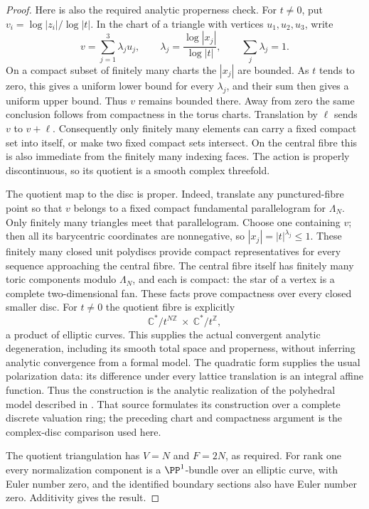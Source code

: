 \begin{proof}
Here is also the required analytic properness check. For $t\ne0$,
put $v_i=\log|z_i|/\log|t|$. In the chart of a triangle with
vertices $u_1,u_2,u_3$, write
\[
 v=\sum_{j=1}^3\lambda_j u_j,\qquad
 \lambda_j=\frac{\log|x_j|}{\log|t|},\qquad
 \sum_j\lambda_j=1.
\]
On a compact subset of finitely many charts the $|x_j|$ are
bounded. As $t$ tends to zero, this gives a uniform lower bound
for every $\lambda_j$, and their sum then gives a uniform upper
bound. Thus $v$ remains bounded there. Away from zero the same
conclusion follows from compactness in the torus charts.
Translation by $\ell$ sends $v$ to $v+\ell$. Consequently only
finitely many elements can carry a fixed compact set into itself,
or make two fixed compact sets intersect. On the central fibre
this is also immediate from the finitely many indexing faces.
The action is properly discontinuous, so its quotient is a smooth
complex threefold.

The quotient map to the disc is proper. Indeed, translate any
punctured-fibre point so that $v$ belongs to a fixed compact
fundamental parallelogram for $\Lambda_N$. Only finitely many
triangles meet that parallelogram. Choose one containing $v$;
then all its barycentric coordinates are nonnegative, so
$|x_j|=|t|^{\lambda_j}\le1$. These finitely many closed unit
polydiscs provide compact representatives for every sequence
approaching the central fibre. The central fibre itself has
finitely many toric components modulo $\Lambda_N$, and each is
compact: the star of a vertex is a complete two-dimensional fan.
These facts prove compactness over every closed smaller disc.
For $t\ne0$ the quotient fibre is explicitly
\[
 \mathbb C^*/t^{N\mathbb Z}\ \times\
 \mathbb C^*/t^{\mathbb Z},
\]
a product of elliptic curves. This supplies the actual convergent
analytic degeneration, including its smooth total space and
properness, without inferring analytic convergence from a formal
model. The quadratic form supplies the usual polarization data:
its difference under every lattice translation is an integral
affine function. Thus the construction is the analytic realization
of the polyhedral model described in
\cite[Section~6, especially (6.3)--(6.7)]{Mumford1972}.
That source formulates its construction over a complete discrete
valuation ring; the preceding chart and compactness argument is
the complex-disc comparison used here.

The quotient triangulation has $V=N$ and $F=2N$, as required.
For rank one every normalization component is a $\PP^1$-bundle over an elliptic curve, with Euler number zero, and the identified boundary sections also have Euler number zero. Additivity gives the result.
\end{proof}
